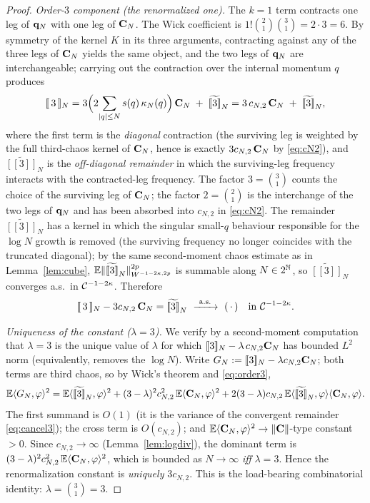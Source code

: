 \begin{proof}
\emph{Order-$3$ component (the renormalized one).} The $k=1$ term contracts one leg
of $\mathbf{q}_N$ with one leg of $\mathbf{C}_N$. The Wick coefficient is
$1!\binom{2}{1}\binom{3}{1}=2\cdot3=6$. By symmetry of the kernel $K$ in its three
arguments, contracting against any of the three legs of $\mathbf{C}_N$ yields the same
object, and the two legs of $\mathbf{q}_N$ are interchangeable; carrying out the
contraction over the internal momentum $q$ produces
\begin{equation}\label{eq:order3}
[\![\,3\,]\!]_N=3\Bigl(2\!\sum_{|q|\le N}s(q)\,\kappa_N(q)\Bigr)\,\mathbf{C}_N\;+\;\widetilde{[\![3]\!]}_N
=3\,c_{N,2}\,\mathbf{C}_N\;+\;\widetilde{[\![3]\!]}_N ,
\end{equation}
where the first term is the \emph{diagonal} contraction (the surviving leg is
weighted by the full third-chaos kernel of $\mathbf{C}_N$, hence is exactly
$3c_{N,2}\,\mathbf{C}_N$ by \eqref{eq:cN2}), and $\widetilde{[\![3]\!]}_N$ is the
\emph{off-diagonal remainder} in which the surviving-leg frequency interacts with
the contracted-leg frequency. The factor $3=\binom{3}{1}$ counts the choice of the
surviving leg of $\mathbf{C}_N$; the factor $2=\binom{2}{1}$ is the interchange of the
two legs of $\mathbf{q}_N$ and has been absorbed into $c_{N,2}$ in \eqref{eq:cN2}. The
remainder $\widetilde{[\![3]\!]}_N$ has a kernel in which the singular small-$q$
behaviour responsible for the $\log N$ growth is removed (the surviving frequency
no longer coincides with the truncated diagonal); by the same second-moment chaos
estimate as in Lemma~\ref{lem:cube},
$\mathbb{E}\|\widetilde{[\![3]\!]}_N\|_{W^{-1-2\kappa,2p}}^{2p}$ is summable along
$N\in2^{\mathbb{N}}$, so $\widetilde{[\![3]\!]}_N$ converges a.s.\ in $\mathcal{C}^{-1-2\kappa}$.
Therefore
\begin{equation}\label{eq:cancel3}
[\![\,3\,]\!]_N-3c_{N,2}\,\qoneIqc_N=\widetilde{[\![3]\!]}_N\ \xrightarrow{\ \mathrm{a.s.}\ }\ (\,\cdot\,)\quad\text{in }\qoneC^{-1-2\kappa}.
\end{equation}

\emph{Uniqueness of the constant ($\lambda=3$).} We verify by a second-moment
computation that $\lambda=3$ is the unique value of $\lambda$ for which
$[\![3]\!]_N-\lambda\,c_{N,2}\mathbf{C}_N$ has bounded $L^2$ norm (equivalently, removes
the $\log N$). Write $G_N:=[\![3]\!]_N-\lambda c_{N,2}\mathbf{C}_N$; both terms are third
chaos, so by Wick's theorem and \eqref{eq:order3},
\[
\mathbb{E}\langle G_N,\varphi\rangle^2
=\mathbb{E}\langle\widetilde{[\![3]\!]}_N,\varphi\rangle^2
+(3-\lambda)^2c_{N,2}^2\,\mathbb{E}\langle\mathbf{C}_N,\varphi\rangle^2
+2(3-\lambda)c_{N,2}\,\mathbb{E}\langle\widetilde{[\![3]\!]}_N,\varphi\rangle\langle\mathbf{C}_N,\varphi\rangle .
\]
The first summand is $O(1)$ (it is the variance of the convergent remainder
\eqref{eq:cancel3}); the cross term is $O(c_{N,2})$; and
$\mathbb{E}\langle\mathbf{C}_N,\varphi\rangle^2\to\|\mathbf{C}\|$-type constant $>0$. Since
$c_{N,2}\to\infty$ (Lemma~\ref{lem:logdiv}), the dominant term is
$(3-\lambda)^2c_{N,2}^2\,\mathbb{E}\langle\mathbf{C}_N,\varphi\rangle^2$, which is bounded as
$N\to\infty$ \emph{iff} $\lambda=3$. Hence the renormalization constant is
\emph{uniquely} $3c_{N,2}$. This is the load-bearing combinatorial identity:
$\lambda=\binom{3}{1}=3$.


\end{proof}
